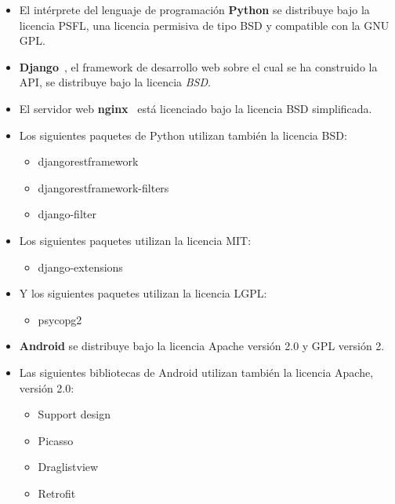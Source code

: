\begin{itemize}
\item El intérprete del lenguaje de programación \textbf{Python} se distribuye
  bajo la licencia \ac{PSFL}, una licencia permisiva de tipo \ac{BSD} y
  compatible con la \ac{GNU} \ac{GPL}.

\item \textbf{Django}~\cite{django:mvc}, el framework de desarrollo web sobre el
  cual se ha construido la API, se distribuye bajo la licencia \textit{\ac{BSD}}.

\item El servidor web \textbf{nginx}~\cite{nginx} está licenciado bajo la
  licencia \ac{BSD} simplificada.

\item Los siguientes paquetes de Python utilizan también la licencia \ac{BSD}:
  \begin{itemize}
  \item djangorestframework
  \item djangorestframework-filters
  \item django-filter
  \end{itemize}

\item Los siguientes paquetes utilizan la licencia \ac{MIT}:
  \begin{itemize}
  \item django-extensions
  \end{itemize}

\item Y los siguientes paquetes utilizan la licencia \ac{LGPL}:
  \begin{itemize}
  \item psycopg2
  \end{itemize}

\item \textbf{Android} se distribuye bajo la licencia Apache versión 2.0 y GPL
  versión 2.

\item Las siguientes bibliotecas de Android utilizan también la licencia Apache,
  versión 2.0:
  \begin{itemize}
  \item Support design
  \item Picasso
  \item Draglistview
  \item Retrofit
  \end{itemize}
\end{itemize}


